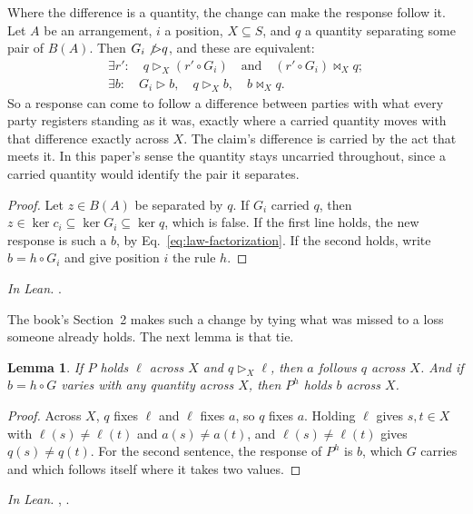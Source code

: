 \documentclass[11pt]{amsart}
\makeatletter
\newcounter{lemma@item}
\theoremstyle{plain}
\newtheorem{lemma}[lemma@item]{Lemma}
\newcommand{\inlean}[1]{\par\noindent\textit{In Lean.} #1\par\medskip}
\makeatother
\begin{document}
Where the difference is a quantity, the change can make the response follow it. Let $A$ be an arrangement, $i$ a position, $X\subseteq S$, and $q$ a quantity separating some pair of $B(A)$. Then $G_i\not\rhd q$, and these are equivalent:
\begin{equation}\label{eq:attachment}
  \begin{gathered}
  \exists r':\quad q\rhd_X(r'\circ G_i)\quad\text{and}\quad(r'\circ G_i)\bowtie_Xq;\\
  \exists b:\quad G_i\rhd b,\quad q\rhd_Xb,\quad b\bowtie_Xq.
  \end{gathered}
\end{equation}
So a response can come to follow a difference between parties with what every party registers standing as it was, exactly where a carried quantity moves with that difference exactly across $X$. The claim's difference is carried by the act that meets it. In this paper's sense the quantity stays uncarried throughout, since a carried quantity would identify the pair it separates.

\begin{proof}
Let $z\in B(A)$ be separated by $q$. If $G_i$ carried $q$, then $z\in\ker c_i\subseteq\ker G_i\subseteq\ker q$, which is false. If the first line holds, the new response is such a $b$, by Eq.~\eqref{eq:law-factorization}. If the second holds, write $b=h\circ G_i$ and give position $i$ the rule $h$.
\end{proof}
\inlean{.}

The book's Section~2 makes such a change by tying what was missed to a loss someone already holds. The next lemma is that tie.

\begin{lemma}\label{lem:tied}
If $P$ holds $\ell$ across $X$ and $q\rhd_X\ell$, then $a$ follows $q$ across $X$. And if $b=h\circ G$ varies with any quantity across $X$, then $P^h$ holds $b$ across $X$.
\end{lemma}
\begin{proof}
Across $X$, $q$ fixes $\ell$ and $\ell$ fixes $a$, so $q$ fixes $a$. Holding $\ell$ gives $s,t\in X$ with $\ell(s)\ne\ell(t)$ and $a(s)\ne a(t)$, and $\ell(s)\ne\ell(t)$ gives $q(s)\ne q(t)$. For the second sentence, the response of $P^h$ is $b$, which $G$ carries and which follows itself where it takes two values.
\end{proof}
\inlean{, \lean{Composition.attached_holds}.}
\end{document}
